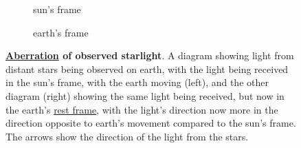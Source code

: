 \begin{figure}[H]
	\centering
	\begin{subfigure}{0.45\textwidth}
    \centering
    \caption{sun's frame}
    \label{subfig_1: suns frame}
\end{subfigure}
\begin{subfigure}{0.45\textwidth}
    \centering
    \caption{earth's frame}
    \label{subfig_2: earths frame}
\end{subfigure}
	\caption{\textbf{\protect\hyperlink{def-aberration}{Aberration} of observed starlight}. A diagram showing light from distant stars being observed on earth, with the light being received in the sun's frame, with the earth moving (left), and the other diagram (right) showing the same light being received, but now in the earth's \protect\hyperlink{def-proper-frame}{rest frame}, with the light's direction now more in the direction opposite to earth's movement compared to the sun's frame. The arrows show the direction of the light from the stars.}
	\label{fig: title}
\end{figure}

